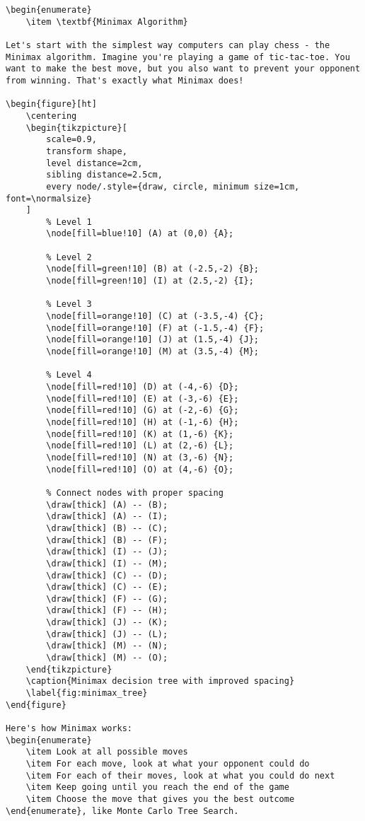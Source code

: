 \documentclass[11pt]{article}
\begin{document}
\begin{lstlisting}[style=Python]
\begin{enumerate}
    \item \textbf{Minimax Algorithm}

Let's start with the simplest way computers can play chess - the Minimax algorithm. Imagine you're playing a game of tic-tac-toe. You want to make the best move, but you also want to prevent your opponent from winning. That's exactly what Minimax does!

\begin{figure}[ht]
    \centering
    \begin{tikzpicture}[
        scale=0.9,
        transform shape,
        level distance=2cm,
        sibling distance=2.5cm,
        every node/.style={draw, circle, minimum size=1cm, font=\normalsize}
    ]
        % Level 1
        \node[fill=blue!10] (A) at (0,0) {A};
        
        % Level 2
        \node[fill=green!10] (B) at (-2.5,-2) {B};
        \node[fill=green!10] (I) at (2.5,-2) {I};
        
        % Level 3
        \node[fill=orange!10] (C) at (-3.5,-4) {C};
        \node[fill=orange!10] (F) at (-1.5,-4) {F};
        \node[fill=orange!10] (J) at (1.5,-4) {J};
        \node[fill=orange!10] (M) at (3.5,-4) {M};
        
        % Level 4
        \node[fill=red!10] (D) at (-4,-6) {D};
        \node[fill=red!10] (E) at (-3,-6) {E};
        \node[fill=red!10] (G) at (-2,-6) {G};
        \node[fill=red!10] (H) at (-1,-6) {H};
        \node[fill=red!10] (K) at (1,-6) {K};
        \node[fill=red!10] (L) at (2,-6) {L};
        \node[fill=red!10] (N) at (3,-6) {N};
        \node[fill=red!10] (O) at (4,-6) {O};
        
        % Connect nodes with proper spacing
        \draw[thick] (A) -- (B);
        \draw[thick] (A) -- (I);
        \draw[thick] (B) -- (C);
        \draw[thick] (B) -- (F);
        \draw[thick] (I) -- (J);
        \draw[thick] (I) -- (M);
        \draw[thick] (C) -- (D);
        \draw[thick] (C) -- (E);
        \draw[thick] (F) -- (G);
        \draw[thick] (F) -- (H);
        \draw[thick] (J) -- (K);
        \draw[thick] (J) -- (L);
        \draw[thick] (M) -- (N);
        \draw[thick] (M) -- (O);
    \end{tikzpicture}
    \caption{Minimax decision tree with improved spacing}
    \label{fig:minimax_tree}
\end{figure}

Here's how Minimax works:
\begin{enumerate}
    \item Look at all possible moves
    \item For each move, look at what your opponent could do
    \item For each of their moves, look at what you could do next
    \item Keep going until you reach the end of the game
    \item Choose the move that gives you the best outcome
\end{enumerate}, like Monte Carlo Tree Search.


\end{lstlisting}
\end{document}
